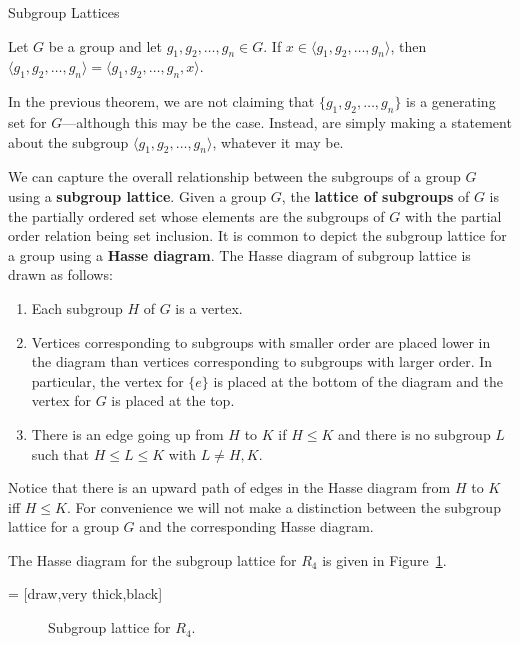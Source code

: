 \begin{section}{Subgroup Lattices}
\begin{theorem}
Let $G$ be a group and let $g_1,g_2,\ldots,g_n\in G$.  If $x\in\langle g_1,g_2,\ldots,g_n\rangle$, then $\langle g_1,g_2,\ldots,g_n\rangle = \langle g_1,g_2,\ldots,g_n,x\rangle$.
\end{theorem}

In the previous theorem, we are not claiming that $\{g_1,g_2,\ldots,g_n\}$ is a generating set for $G$---although this may be the case.  Instead, are simply making a statement about the subgroup $\langle g_1,g_2,\ldots,g_n\rangle$, whatever it may be.

We can capture the overall relationship between the subgroups of a group $G$ using a \textbf{subgroup lattice}.  Given a group $G$, the \textbf{lattice of subgroups} of $G$ is the partially ordered set whose elements are the subgroups of $G$ with the partial order relation being set inclusion. It is common to depict the subgroup lattice for a group using a \textbf{Hasse diagram}.  The Hasse diagram of subgroup lattice is drawn as follows:
\begin{enumerate}[label=\rm{(\arabic*)}]
\item Each subgroup $H$ of $G$ is a vertex.
\item Vertices corresponding to subgroups with smaller order are placed lower in the diagram than vertices corresponding to subgroups with larger order.  In particular, the vertex for $\{e\}$ is placed at the bottom of the diagram and the vertex for $G$ is placed at the top.
\item There is an edge going up from $H$ to $K$ if $H\leq K$ and there is no subgroup $L$ such that $H\leq L\leq K$ with $L\neq H,K$.
\end{enumerate}
Notice that there is an upward path of edges in the Hasse diagram from $H$ to $K$ iff $H\leq K$. For convenience we will not make a distinction between the subgroup lattice for a group $G$ and the corresponding Hasse diagram. 

The Hasse diagram for the subgroup lattice for $R_4$ is given in Figure~\ref{fig:latticeR4}.

 = [draw,very thick,black]

\begin{figure}[!ht]
\centering
{}
\caption{Subgroup lattice for $R_4$.}
\label{fig:latticeR4}
\end{figure}


\end{section}
